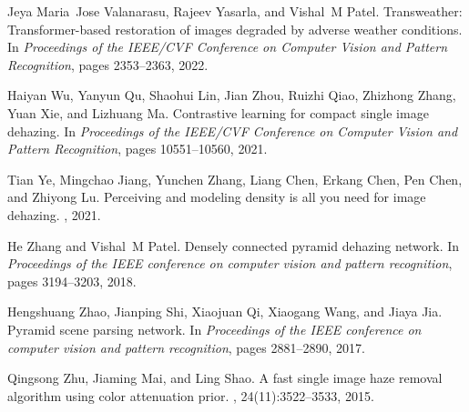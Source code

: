 \documentclass[10pt,twocolumn,letterpaper]{article}
\begin{document}
\begin{thebibliography}{10}
Jeya Maria~Jose Valanarasu, Rajeev Yasarla, and Vishal~M Patel.
\newblock Transweather: Transformer-based restoration of images degraded by
  adverse weather conditions.
\newblock In {\em Proceedings of the IEEE/CVF Conference on Computer Vision and
  Pattern Recognition}, pages 2353--2363, 2022.

Haiyan Wu, Yanyun Qu, Shaohui Lin, Jian Zhou, Ruizhi Qiao, Zhizhong Zhang, Yuan
  Xie, and Lizhuang Ma.
\newblock Contrastive learning for compact single image dehazing.
\newblock In {\em Proceedings of the IEEE/CVF Conference on Computer Vision and
  Pattern Recognition}, pages 10551--10560, 2021.

Tian Ye, Mingchao Jiang, Yunchen Zhang, Liang Chen, Erkang Chen, Pen Chen, and
  Zhiyong Lu.
\newblock Perceiving and modeling density is all you need for image dehazing.
, 2021.

He Zhang and Vishal~M Patel.
\newblock Densely connected pyramid dehazing network.
\newblock In {\em Proceedings of the IEEE conference on computer vision and
  pattern recognition}, pages 3194--3203, 2018.

Hengshuang Zhao, Jianping Shi, Xiaojuan Qi, Xiaogang Wang, and Jiaya Jia.
\newblock Pyramid scene parsing network.
\newblock In {\em Proceedings of the IEEE conference on computer vision and
  pattern recognition}, pages 2881--2890, 2017.

Qingsong Zhu, Jiaming Mai, and Ling Shao.
\newblock A fast single image haze removal algorithm using color attenuation
  prior.
, 24(11):3522--3533, 2015.

\end{thebibliography}
\end{document}

